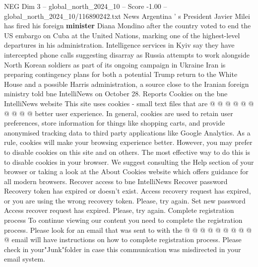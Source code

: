 \begin{textsample}{NEG Dim 3 – global\_north\_2024\_10 – Score -1.00 – global\_north\_2024\_10/116890242.txt}
News Argentina ' s President Javier Milei has fired his foreign \textbf{minister} Diana Mondino after the country voted to end the US embargo on Cuba at the United Nations, marking one of the highest-level departures in his administration.
Intelligence services in Kyiv say they have intercepted phone calls suggesting disarray as Russia attempts to work alongside North Korean soldiers as part of its ongoing campaign in Ukraine Iran is preparing contingency plans for both a potential Trump return to the White House and a possible Harris administration, a source close to the Iranian foreign ministry told bne IntelliNews on October 28.
Reports Cookies on the bne IntelliNews website This site uses cookies - small text files that are @ @ @ @ @ @ @ @ @ @ better user experience.
In general, cookies are used to retain user preferences, store information for things like shopping carts, and provide anonymised tracking data to third party applications like Google Analytics.
As a rule, cookies will make your browsing experience better.
However, you may prefer to disable cookies on this site and on others.
The most effective way to do this is to disable cookies in your browser.
We suggest consulting the Help section of your browser or taking a look at the About Cookies website which offers guidance for all modern browsers.
Recover access to bne IntelliNews Recover password Recovery token has expired or doesn't exist.
Access recovery request has expired, or you are using the wrong recovery token.
Please, try again.
Set new password Access recover request has expired.
Please, try again.
Complete registration process To continue viewing our content you need to complete the registration process.
Please look for an email that was sent to with the @ @ @ @ @ @ @ @ @ @ email will have instructions on how to complete registration process.
Please check in your"Junk"folder in case this communication was misdirected in your email system.

\end{textsample}
